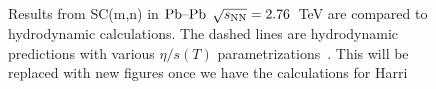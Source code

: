 \documentclass[ALICE,manyauthors]{cernphprep}
\begin{document}
\begin{figure}[htbp]
            \begin{center}
              \end{center}
        \caption{Results from SC(m,n) in $\textnormal{Pb--Pb}$ $\sqrt{s_{\textnormal{NN}}}=2.76$~TeV are compared to hydrodynamic calculations. The dashed lines are hydrodynamic predictions with various $\eta/s(T)$ parametrizations~\cite{Niemi:2015qia}. This will be replaced with new figures once we have the calculations for Harri}
        \label{fig:Figure_4}
\end{figure}
\end{document}
